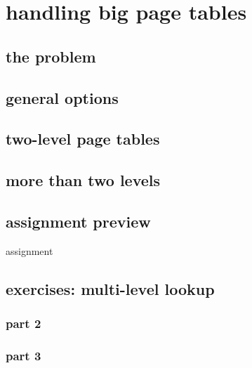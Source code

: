 

\section{handling big page tables}
\subsection{the problem}


\subsection{general options}


\subsection{two-level page tables}




\subsection{more than two levels}


\subsection{assignment preview}
\begin{frame}{assignment}
\end{frame}

\subsection{exercises: multi-level lookup}
\subsubsection{part 2}

\subsubsection{part 3}


